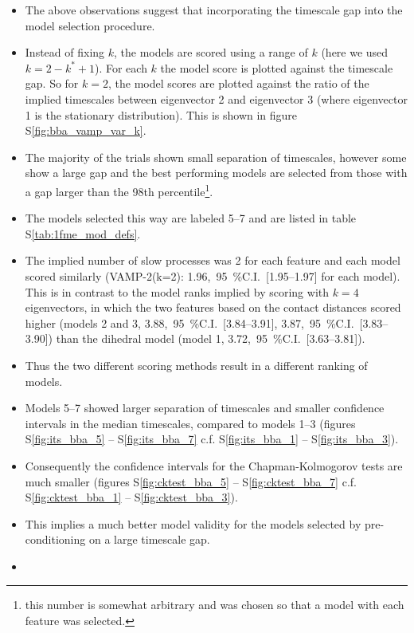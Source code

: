 \documentclass[journal=jacsat,manuscript=article]{achemso}
\newcommand{\numci}[3]{\num{#1},\ \SI{95}{\percent}C.I.\ [\numrange[range-phrase=---]{#2}{#3}]}
\newcommand*\sref[1]{%
    S\ref{#1}}
\begin{document}
\begin{itemize}
    \item The above observations suggest that incorporating the timescale gap into the model selection procedure. 
    \item Instead of fixing $k$, the models are scored using a range of $k$ (here we used $k=2-k^{*}+1$). For each $k$ the model score is plotted against the timescale gap. So for $k=2$, the model scores are plotted against the ratio of the implied timescales between eigenvector 2 and eigenvector 3 (where eigenvector 1 is the stationary distribution).  This is shown in figure \sref{fig:bba_vamp_var_k}.  
    \item The majority of the trials shown small separation of timescales, however some show a large gap and the best performing models are selected from those with a gap larger than the 98th percentile\footnote{this number is somewhat arbitrary and was chosen so that a model with each feature was selected.}. 
    \item The models selected this way are labeled \numrange{5}{7} and are listed in table \sref{tab:1fme_mod_defs}.  
    \item The implied number of slow processes was \num{2} for each feature and each model scored similarly (VAMP-2(k=2): \numci{1.96}{1.95}{1.97} for each model). This is in contrast to the model ranks implied by scoring with $k=4$ eigenvectors, in which the two features based on the contact distances  scored higher (models 2 and 3, \numci{3.88}{3.84}{3.91}, \numci{3.87}{3.83}{3.90}) than the dihedral model (model 1, \numci{3.72}{3.63}{3.81}). 
    \item Thus the two different scoring methods result in a different ranking of models.  
    \item Models \numrange{5}{7} showed larger separation of timescales and smaller confidence intervals in the median timescales, compared to models \numrange{1}{3} (figures \sref{fig:its_bba_5} -- \sref{fig:its_bba_7} c.f. \sref{fig:its_bba_1} -- \sref{fig:its_bba_3}). 
    \item Consequently the confidence intervals for the Chapman-Kolmogorov tests are much smaller (figures \sref{fig:cktest_bba_5} -- \sref{fig:cktest_bba_7} c.f. \sref{fig:cktest_bba_1} -- \sref{fig:cktest_bba_3}).  
    \item This implies a much better model validity for the models selected by pre-conditioning on a large timescale gap. 
    \item 
\end{itemize}
\end{document}
